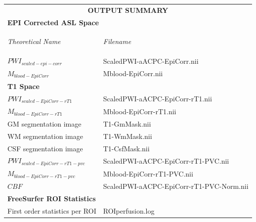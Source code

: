 \documentclass[letterpaper,11pt]{article}
\newcommand{\norm}{\normalsize}
\begin{document}
{\centering

\begin{table}[H]
\begin{tabular}{l @{  ................................................  }l }
\multicolumn{2}{c}{\textbf{{\norm OUTPUT SUMMARY}}} \\[1.5ex]

\multicolumn{2}{l}{\textbf{EPI Corrected ASL Space}} \\[1.5ex]      

\begin{med}\emph{Theoretical Name}\end{med} & \begin{med}\emph{Filename}\end{med} \\[1.5ex]

$PWI_{scaled-epi-corr}$ & {\ttfamily ScaledPWI-aACPC-EpiCorr.nii} \\
$M_{blood-EpiCorr}$    & {\ttfamily Mblood-EpiCorr.nii}    \\[1.5ex]                

\multicolumn{2}{l}{\textbf{T1 Space}} \\[1.5ex] 

$PWI_{scaled-EpiCorr-rT1}$ & {\ttfamily ScaledPWI-aACPC-EpiCorr-rT1.nii} \\
$M_{blood-EpiCorr-rT1}$ & {\ttfamily Mblood-EpiCorr-rT1.nii}        \\[1.5ex]

GM  segmentation image & {\ttfamily T1-GmMask.nii} \\
WM  segmentation image & {\ttfamily T1-WmMask.nii} \\
CSF segmentation image & {\ttfamily T1-CsfMask.nii} \\[1.5ex]


$PWI_{scaled-EpiCorr-rT1-pvc}$ & {\ttfamily ScaledPWI-aACPC-EpiCorr-rT1-PVC.nii} \\
$M_{blood-EpiCorr-rT1-pvc}$    & {\ttfamily Mblood-EpiCorr-rT1-PVC.nii}  \\[1.5ex]  

$CBF$ & {\ttfamily ScaledPWI-aACPC-EpiCorr-rT1-PVC-Norm.nii} \\[1.5ex]

\multicolumn{2}{l}{\textbf{FreeSurfer ROI Statistics}} \\[1.5ex]
First order statistics per  ROI  & {\ttfamily ROIperfusion.log}

\end{tabular}
\end{table}
} %
\end{document}

